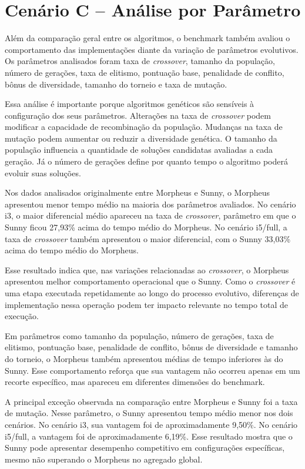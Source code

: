 \section{Cenário C -- Análise por Parâmetro}
\label{sec:cenario-c-parametro}

Além da comparação geral entre os algoritmos, o benchmark também avaliou o comportamento das implementações diante da variação de parâmetros evolutivos. Os parâmetros analisados foram taxa de \textit{crossover}, tamanho da população, número de gerações, taxa de elitismo, pontuação base, penalidade de conflito, bônus de diversidade, tamanho do torneio e taxa de mutação.

Essa análise é importante porque algoritmos genéticos são sensíveis à configuração dos seus parâmetros. Alterações na taxa de \textit{crossover} podem modificar a capacidade de recombinação da população. Mudanças na taxa de mutação podem aumentar ou reduzir a diversidade genética. O tamanho da população influencia a quantidade de soluções candidatas avaliadas a cada geração. Já o número de gerações define por quanto tempo o algoritmo poderá evoluir suas soluções.

Nos dados analisados originalmente entre Morpheus e Sunny, o Morpheus apresentou menor tempo médio na maioria dos parâmetros avaliados. No cenário i3, o maior diferencial médio apareceu na taxa de \textit{crossover}, parâmetro em que o Sunny ficou 27,93\% acima do tempo médio do Morpheus. No cenário i5/full, a taxa de \textit{crossover} também apresentou o maior diferencial, com o Sunny 33,03\% acima do tempo médio do Morpheus.

Esse resultado indica que, nas variações relacionadas ao \textit{crossover}, o Morpheus apresentou melhor comportamento operacional que o Sunny. Como o \textit{crossover} é uma etapa executada repetidamente ao longo do processo evolutivo, diferenças de implementação nessa operação podem ter impacto relevante no tempo total de execução.

Em parâmetros como tamanho da população, número de gerações, taxa de elitismo, pontuação base, penalidade de conflito, bônus de diversidade e tamanho do torneio, o Morpheus também apresentou médias de tempo inferiores às do Sunny. Esse comportamento reforça que sua vantagem não ocorreu apenas em um recorte específico, mas apareceu em diferentes dimensões do benchmark.

A principal exceção observada na comparação entre Morpheus e Sunny foi a taxa de mutação. Nesse parâmetro, o Sunny apresentou tempo médio menor nos dois cenários. No cenário i3, sua vantagem foi de aproximadamente 9,50\%. No cenário i5/full, a vantagem foi de aproximadamente 6,19\%. Esse resultado mostra que o Sunny pode apresentar desempenho competitivo em configurações específicas, mesmo não superando o Morpheus no agregado global.

